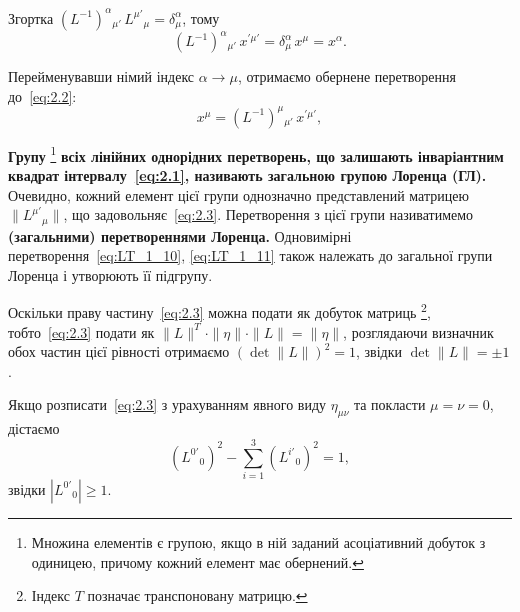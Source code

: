 Згортка $(L^{-1})^{\alpha}{}_{\mu'} \, L^{\mu'}{}_{\mu} = \delta^{\alpha}_{\mu}$, тому
\begin{equation*}
  (L^{-1})^{\alpha}{}_{\mu'} \, x^{\prime\mu'} = \delta^{\alpha}_{\mu} \, x^{\mu} = x^{\alpha}.
\end{equation*}

Перейменувавши німий індекс $\alpha \to \mu$, отримаємо обернене перетворення до~\eqref{eq:2.2}:
\begin{equation}\label{eq:Direct_tranformation}
  x^{\mu} = (L^{-1})^{\mu}{}_{\mu'} \, x^{\prime\mu'},
\end{equation}

\textbf{Групу}%
\footnote{Множина елементів є групою, якщо в ній заданий асоціативний добуток з одиницею, причому кожний елемент має
  обернений.} \textbf{всіх лінійних однорідних перетворень, що залишають інваріантним квадрат інтервалу~\eqref{eq:2.1},
  називають загальною групою Лоренца (ГЛ).} Очевидно, кожний елемент цієї групи однозначно представлений матрицею
  $\|L^{\mu'}{}_\mu\|$, що задовольняє~\eqref{eq:2.3}. Перетворення з цієї групи називатимемо \textbf{(загальними)
  перетвореннями Лоренца.} Одновимірні перетворення~\eqref{eq:LT_1_10}, \eqref{eq:LT_1_11} також належать до загальної
  групи Лоренца і утворюють її підгрупу.

Оскільки праву частину~\eqref{eq:2.3} можна подати як добуток матриць%
\footnote{Індекс $T$ позначає транспоновану матрицю.}, тобто~\eqref{eq:2.3} подати як $\|L\|^T \cdot \|\eta\| \cdot
\|L\| = \|\eta\|$, розглядаючи визначник обох частин цієї рівності отримаємо $(\det \|L\|)^2 = 1$, звідки $\det \|L\| =
\pm 1$.

Якщо розписати~\eqref{eq:2.3} з урахуванням явного виду $\eta_{\mu\nu}$ та покласти $\mu = \nu = 0$, дістаємо
\begin{equation*}
  (L^{0'}{}_0)^2 - \sum_{i=1}^{3}(L^{i'}{}_0)^2 = 1,
\end{equation*}
звідки $|L^{0'}{}_0| \geqslant1$.

